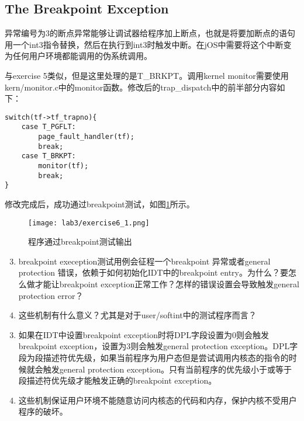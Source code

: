 \subsection{The Breakpoint Exception}
\par 异常编号为3的断点异常能够让调试器给程序加上断点，也就是将要加断点的语句用一个int3指令替换，然后在执行到int3时触发中断。在jOS中需要将这个中断变为任何用户环境都能调用的伪系统调用。
\begin{exerciseSolution}{6}
    \par 与exercise 5类似，但是这里处理的是T\_BRKPT。调用kernel monitor需要使用kern/monitor.c中的monitor函数。修改后的trap\_dispatch中的前半部分内容如下：
    \begin{lstlisting}
switch(tf->tf_trapno){
    case T_PGFLT:
        page_fault_handler(tf);
        break;
    case T_BRKPT:
        monitor(tf);
        break;
}
    \end{lstlisting}
    \par 修改完成后，成功通过breakpoint测试，如图\ref{fig:lab3/exercise6_1}所示。
    \begin{figure}[htb]
        \centering
        \texttt{[image: lab3/exercise6\_1.png]}
        \caption{程序通过breakpoint测试输出}
        \label{fig:lab3/exercise6_1}
    \end{figure}
\end{exerciseSolution}

\begin{questionEnv}
    \begin{enumerate}
        \setcounter{enumi}{2}
        \item breakpoint exeception测试用例会征程一个breakpoint 异常或者general protection 错误，依赖于如何初始化IDT中的breakpoint entry。为什么？要怎么做才能让breakpoint exception正常工作？怎样的错误设置会导致触发general protection error？
        \item 这些机制有什么意义？尤其是对于user/softint中的测试程序而言？
    \end{enumerate}
\end{questionEnv}
\begin{answer}
    \begin{enumerate}
        \setcounter{enumi}{2}
        \item 如果在IDT中设置breakpoint exception时将DPL字段设置为0则会触发breakpoint exception，设置为3则会触发general protection exception。DPL字段为段描述符优先级，如果当前程序为用户态但是尝试调用内核态的指令的时候就会触发general protection exception。只有当前程序的优先级小于或等于段描述符优先级才能触发正确的breakpoint exception。
        \item 这些机制保证用户环境不能随意访问内核态的代码和内存，保护内核不受用户程序的破坏。
    \end{enumerate}
\end{answer}

